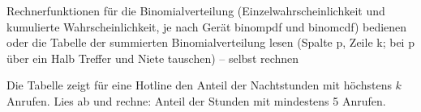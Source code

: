 \begin{aufgabe}{Rechnerfunktionen für die Binomialverteilung (Einzelwahrscheinlichkeit und kumulierte Wahrscheinlichkeit, je nach Gerät binompdf und binomcdf) bedienen oder die Tabelle der summierten Binomialverteilung lesen (Spalte p, Zeile k; bei p über ein Halb Treffer und Niete tauschen) – selbst rechnen}
\begin{teile}
\teil Die Tabelle zeigt für eine Hotline den Anteil der Nachtstunden mit höchstens $k$ Anrufen. Lies ab und rechne: Anteil der Stunden mit mindestens 5 Anrufen.

\leerfeld
\end{teile}
\end{aufgabe}
